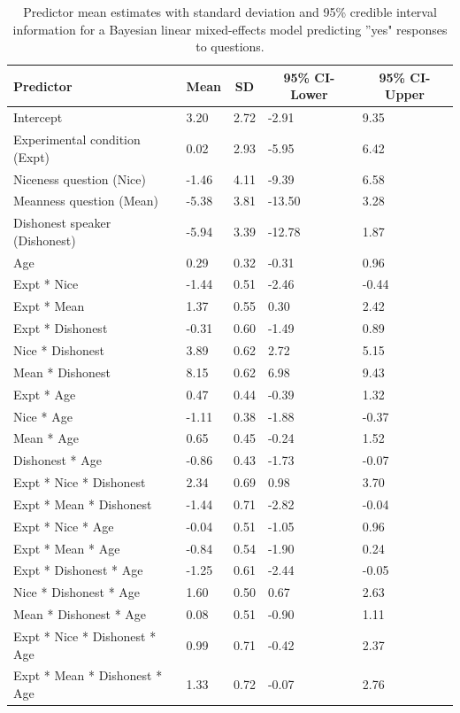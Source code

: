 \documentclass[oneside]{report}
\begin{document}
\begin{table}[tbp]
\begin{center}
\begin{threeparttable}
\caption{\label{tab:trupol_brm}Predictor mean estimates with standard deviation and 95\% credible interval information for a Bayesian linear mixed-effects model predicting ''yes" responses to questions.}
\begin{tabular}{lllll}
\toprule
Predictor & \multicolumn{1}{c}{Mean} & \multicolumn{1}{c}{SD} & \multicolumn{1}{c}{95\% CI-Lower} & \multicolumn{1}{c}{95\% CI-Upper}\\
\midrule
Intercept & 3.20 & 2.72 & -2.91 & 9.35\\
Experimental condition (Expt) & 0.02 & 2.93 & -5.95 & 6.42\\
Niceness question (Nice) & -1.46 & 4.11 & -9.39 & 6.58\\
Meanness question (Mean) & -5.38 & 3.81 & -13.50 & 3.28\\
Dishonest speaker (Dishonest) & -5.94 & 3.39 & -12.78 & 1.87\\
Age & 0.29 & 0.32 & -0.31 & 0.96\\
Expt * Nice & -1.44 & 0.51 & -2.46 & -0.44\\
Expt * Mean & 1.37 & 0.55 & 0.30 & 2.42\\
Expt * Dishonest & -0.31 & 0.60 & -1.49 & 0.89\\
Nice * Dishonest & 3.89 & 0.62 & 2.72 & 5.15\\
Mean * Dishonest & 8.15 & 0.62 & 6.98 & 9.43\\
Expt * Age & 0.47 & 0.44 & -0.39 & 1.32\\
Nice * Age & -1.11 & 0.38 & -1.88 & -0.37\\
Mean * Age & 0.65 & 0.45 & -0.24 & 1.52\\
Dishonest * Age & -0.86 & 0.43 & -1.73 & -0.07\\
Expt * Nice * Dishonest & 2.34 & 0.69 & 0.98 & 3.70\\
Expt * Mean * Dishonest & -1.44 & 0.71 & -2.82 & -0.04\\
Expt * Nice * Age & -0.04 & 0.51 & -1.05 & 0.96\\
Expt * Mean * Age & -0.84 & 0.54 & -1.90 & 0.24\\
Expt * Dishonest * Age & -1.25 & 0.61 & -2.44 & -0.05\\
Nice * Dishonest * Age & 1.60 & 0.50 & 0.67 & 2.63\\
Mean * Dishonest * Age & 0.08 & 0.51 & -0.90 & 1.11\\
Expt * Nice * Dishonest * Age & 0.99 & 0.71 & -0.42 & 2.37\\
Expt * Mean * Dishonest * Age & 1.33 & 0.72 & -0.07 & 2.76\\
\bottomrule
\end{tabular}
\end{threeparttable}
\end{center}
\end{table}
\end{document}
